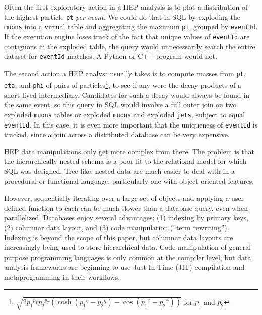 \documentclass[10pt, conference, compsocconf]{IEEEtran}
\begin{document}


\vspace{0.15 cm}
\noindent Often the first exploratory action in a HEP analysis is to plot a distribution of the highest particle {\tt pt} {\it per event.} We could do that in SQL by exploding the {\tt muons} into a virtual table and aggregating the maximum {\tt pt}, grouped by {\tt eventId}. If the execution engine loses track of the fact that unique values of {\tt eventId} are contiguous in the exploded table, the query would unnecessarily search the entire dataset for {\tt eventId} matches. A Python or C++ program would not.

The second action a HEP analyst usually takes is to compute masses from {\tt pt}, {\tt eta}, and {\tt phi} of pairs of particles\footnote{$\sqrt{2 {p_1}^{p_T} {p_2}^{p_T} (\cosh({p_1}^\eta - {p_2}^\eta) - \cos({p_1}^\phi - {p_2}^\phi))}$ for $p_1$ and $p_2$}, to see if any were the decay products of a short-lived intermediary. Candidates for such a decay would always be found in the same event, so this query in SQL would involve a full outer join on two exploded {\tt muons} tables or exploded {\tt muons} and exploded {\tt jets}, subject to equal {\tt eventId}. In this case, it is even more important that the uniqueness of {\tt eventId} is tracked, since a join across a distributed database can be very expensive.

HEP data manipulations only get more complex from there. The problem is that the hierarchically nested schema is a poor fit to the relational model for which SQL was designed. Tree-like, nested data are much easier to deal with in a procedural or functional language, particularly one with object-oriented features.

However, sequentially iterating over a large set of objects and applying a user defined function to each can be much slower than a database query, even when parallelized. Databases enjoy several advantages: (1) indexing by primary keys, (2) columnar data layout, and (3) code manipulation (``term rewriting''). Indexing is beyond the scope of this paper, but columnar data layouts are increasingly being used to store hierarchical data. Code manipulation of general purpose programming languages is only common at the compiler level, but data analysis frameworks are beginning to use Just-In-Time (JIT) compilation and metaprogramming in their workflows.
\end{document}
